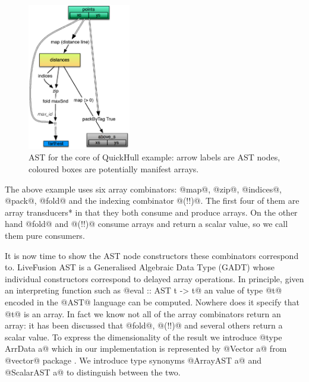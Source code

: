 \documentclass[preamble.tex]{subfiles}
\begin{document}
\begin{figure}
\includegraphics[width=0.4\textwidth,center]{img/QuickHull-flat-but-true}

\caption{\label{fig:QHFlat}{AST for the core of QuickHull example: arrow labels are AST nodes, coloured boxes are potentially manifest arrays.}}
\end{figure}

The above example uses six array combinators: @map@, @zip@, @indices@, @pack@, @fold@ and the indexing combinator @(!!)@. The first four of them are \*array transducers* in that they both consume and produce arrays. On the other hand @fold@ and @(!!)@ consume arrays and return a scalar value, so we call them pure consumers.

It is now time to show the AST node constructors these combinators correspond to. LiveFusion AST is a Generalised Algebraic Data Type (GADT)  whose individual constructors correspond to delayed array operations. In principle, given an interpreting function such as @eval :: AST t -> t@ an value of type @t@ encoded in the @AST@ language can be computed. Nowhere does it specify that @t@ is an array. In fact we know not all of the array combinators return an array: it has been discussed that @fold@, @(!!)@ and several others return a scalar value. To express the dimensionality of the result we introduce @type ArrData a@ which in our implementation is represented by @Vector a@ from @vector@ package . We introduce type synonyms @ArrayAST a@ and @ScalarAST a@ to distinguish between the two.
\end{document}
